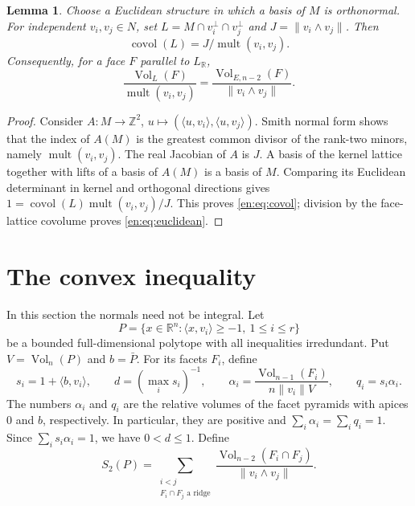 \documentclass[12pt]{amsart}
\newtheorem{lem}[thm]{Lemma}
\theoremstyle{definition}
\theoremstyle{remark}
\numberwithin{equation}{section}
\theoremstyle{plain}
\theoremstyle{definition}
\theoremstyle{remark}
\begin{document}
\begin{lem}\label{en:lem:lattice}
Choose a Euclidean structure in which a basis of $M$ is orthonormal.
For independent $v_i,v_j\in N$, set
$L=M\cap v_i^\perp\cap v_j^\perp$ and $J=\|v_i\wedge v_j\|$.
Then
\begin{equation}\label{en:eq:covol}
 \operatorname{covol}(L)=J/\operatorname{mult}(v_i,v_j).
\end{equation}
Consequently, for a face $F$ parallel to $L_{\mathbb R}$,
\begin{equation}\label{en:eq:euclidean}
 \frac{\operatorname{Vol}_{L}(F)}{\operatorname{mult}(v_i,v_j)}
 =\frac{\operatorname{Vol}_{E,n-2}(F)}{\|v_i\wedge v_j\|}.
\end{equation}
\end{lem}
\begin{proof}
Consider $A:M\to\mathbb Z^2$, $u\mapsto
(\langle u,v_i\rangle,\langle u,v_j\rangle)$.
Smith normal form shows that the index of $A(M)$ is the greatest common divisor of the rank-two minors, namely $\operatorname{mult}(v_i,v_j)$. The real Jacobian of $A$ is $J$. A basis of the kernel lattice together with lifts of a basis of $A(M)$ is a basis of $M$. Comparing its Euclidean determinant in kernel and orthogonal directions gives
$1=\operatorname{covol}(L)\operatorname{mult}(v_i,v_j)/J$.
This proves \eqref{en:eq:covol}; division by the face-lattice covolume proves
\eqref{en:eq:euclidean}.
\end{proof}

\section{The convex inequality}\label{en:sec:convex}
In this section the normals need not be integral. Let
\begin{equation}\label{en:eq:real-polytope}
 P=\{x\in\mathbb R^n:\langle x,v_i\rangle\ge-1,\ 1\le i\le r\}
\end{equation}
be a bounded full-dimensional polytope with all inequalities irredundant.
Put $V=\operatorname{Vol}_n(P)$ and $b=\bar P$. For its facets $F_i$, define
\begin{equation}\label{en:eq:weights}
 s_i=1+\langle b,v_i\rangle,\qquad
 d=(\max_i s_i)^{-1},\qquad
 \alpha_i=\frac{\operatorname{Vol}_{n-1}(F_i)}{n\|v_i\|V},
 \qquad q_i=s_i\alpha_i.
\end{equation}
The numbers $\alpha_i$ and $q_i$ are the relative volumes of the facet pyramids with apices $0$ and $b$, respectively. In particular, they are positive and
$\sum_i\alpha_i=\sum_iq_i=1$. Since $\sum_i s_i\alpha_i=1$, we have $0<d\le1$.
Define
\begin{equation}\label{en:eq:ridge-sum}
 S_2(P)=\sum_{\substack{i<j\\F_i\cap F_j\text{ a ridge}}}
 \frac{\operatorname{Vol}_{n-2}(F_i\cap F_j)}
      {\|v_i\wedge v_j\|}.
\end{equation}
\end{document}
